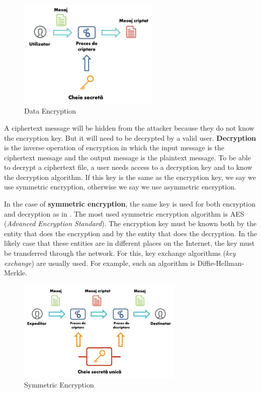 \begin{figure}[htbp]
  \centering
  \def\svgwidth{\columnwidth}
  \includegraphics[width=0.6\textwidth]{chapters/12-auth/img/encryption.svg.pdf}
  \caption{Data Encryption}
  \label{fig:sec:encryption}
\end{figure}

A ciphertext message will be hidden from the attacker because they do not know the encryption key.
But it will need to be decrypted by a valid user.
\textbf{Decryption} is the inverse operation of encryption in which the input message is the ciphertext message and the output message is the plaintext message.
To be able to decrypt a ciphertext file, a user needs access to a decryption key and to know the decryption algorithm.
If this key is the same as the encryption key, we say we use symmetric encryption, otherwise we say we use asymmetric encryption.

In the case of \textbf{symmetric encryption}, the same key is used for both encryption and decryption as in .
The most used symmetric encryption algorithm is AES  (\textit{Advanced Encryption Standard}).
The encryption key must be known both by the entity that does the encryption and by the entity that does the decryption.
In the likely case that these entities are in different places on the Internet, the key must be transferred through the network.
For this, key exchange algorithms (\textit{key exchange}) are usually used.
For example, such an algorithm is Diffie-Hellman-Merkle.

\begin{figure}[htbp]
  \centering
  \def\svgwidth{\columnwidth}
  \includegraphics[width=0.7\textwidth]{chapters/12-auth/img/symmetric-encryption.svg.pdf}
  \caption{Symmetric Encryption}
  \label{fig:sec:symmetric-encryption}
\end{figure}

